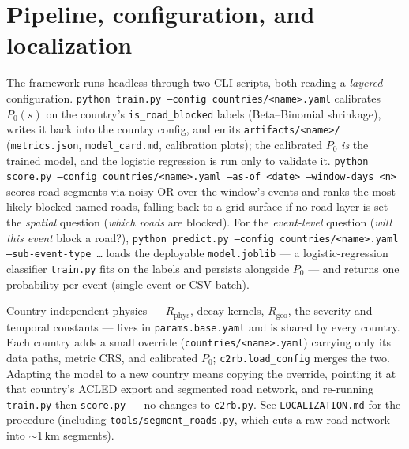 \documentclass[11pt,a4paper]{article}
\newcommand{\code}[1]{\texttt{\small #1}}
\newcommand{\Rphys}{R_{\mathrm{phys}}}
\newcommand{\Rgeo}{R_{\mathrm{geo}}}
\begin{document}
\section{Pipeline, configuration, and localization}

The framework runs headless through two CLI scripts, both reading a \emph{layered} configuration.
\code{python train.py --config countries/<name>.yaml} calibrates $P_0(s)$ on the country's
\code{is\_road\_blocked} labels (Beta--Binomial shrinkage), writes it back into the country config,
and emits \code{artifacts/<name>/} (\code{metrics.json}, \code{model\_card.md}, calibration plots);
the calibrated $P_0$ \emph{is} the trained model, and the logistic regression is run only to
validate it. \code{python score.py --config countries/<name>.yaml --as-of <date> --window-days <n>}
scores road segments via noisy-OR over the window's events and ranks the most likely-blocked named
roads, falling back to a grid surface if no road layer is set --- the \emph{spatial} question
(\emph{which roads} are blocked). For the \emph{event-level} question (\emph{will this event} block
a road?), \code{python predict.py --config countries/<name>.yaml --sub-event-type \ldots} loads the
deployable \code{model.joblib} --- a logistic-regression classifier \code{train.py} fits on the
labels and persists alongside $P_0$ --- and returns one probability per event (single event or CSV
batch).

Country-independent physics --- $\Rphys$, decay kernels, $\Rgeo$, the severity and temporal
constants --- lives in \code{params.base.yaml} and is shared by every country. Each country adds a
small override (\code{countries/<name>.yaml}) carrying only its data paths, metric CRS, and
calibrated $P_0$; \code{c2rb.load\_config} merges the two. Adapting the model to a new country means
copying the override, pointing it at that country's ACLED export and segmented road network, and
re-running \code{train.py} then \code{score.py} --- no changes to \code{c2rb.py}. See
\code{LOCALIZATION.md} for the procedure (including \code{tools/segment\_roads.py}, which cuts a raw
road network into $\sim$1\,km segments).
\end{document}

